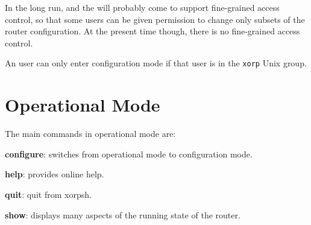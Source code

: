 In the long run, \xorpsh and the \rtrmgr will probably come to support
fine-grained access control, so that some users can be given
permission to change only subsets of the router configuration.  At the
present time though, there is no fine-grained access control.

An user can only enter configuration mode if that user is in the {\tt xorp}
Unix group.

\section{Operational Mode}
\noindent{}
\vspace{0.1in}

The main commands in operational mode are:
\begin{description}
\item{\bf configure}: switches from operational mode to configuration
mode.
\item{\bf help}: provides online help.
\item{\bf quit}: quit from xorpsh.
\item{\bf show}: displays many aspects of the running state of the
router.
\end{description}

\newpage
